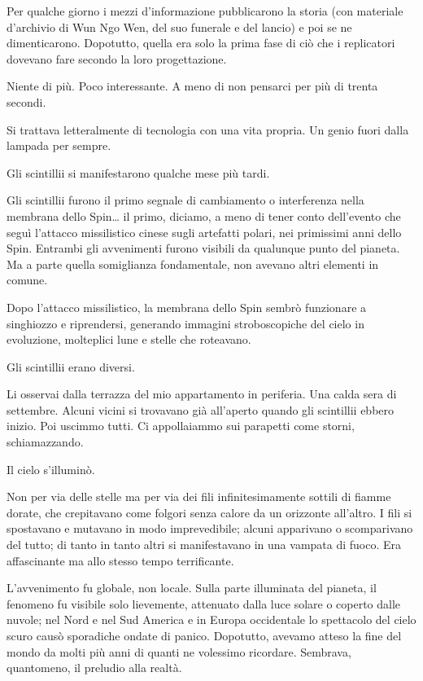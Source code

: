 Per qualche giorno i mezzi d'informazione pubblicarono la storia (con
materiale d'archivio di Wun Ngo Wen, del suo funerale e del lancio) e
poi se ne dimenticarono. Dopotutto, quella era solo la prima fase di ciò
che i replicatori dovevano fare secondo la loro progettazione.

Niente di più. Poco interessante. A meno di non pensarci per più di
trenta secondi.

Si trattava letteralmente di tecnologia con una vita propria. Un genio
fuori dalla lampada per sempre.

\separatorefiori

Gli scintillii si manifestarono qualche mese più tardi.

Gli scintillii furono il primo segnale di cambiamento o interferenza
nella membrana dello Spin\ldots{} il primo, diciamo, a meno di tener
conto dell'evento che seguì l'attacco missilistico cinese sugli
artefatti polari, nei primissimi anni dello Spin. Entrambi gli
avvenimenti furono visibili da qualunque punto del pianeta. Ma a parte
quella somiglianza fondamentale, non avevano altri elementi in comune.

Dopo l'attacco missilistico, la membrana dello Spin sembrò funzionare a
singhiozzo e riprendersi, generando immagini stroboscopiche del cielo in
evoluzione, molteplici lune e stelle che roteavano.

Gli scintillii erano diversi.

Li osservai dalla terrazza del mio appartamento in periferia. Una calda
sera di settembre. Alcuni vicini si trovavano già all'aperto quando gli
scintillii ebbero inizio. Poi uscimmo tutti. Ci appollaiammo sui
parapetti come storni, schiamazzando.

Il cielo s'illuminò.

Non per via delle stelle ma per via dei fili infinitesimamente sottili
di fiamme dorate, che crepitavano come folgori senza calore da un
orizzonte all'altro. I fili si spostavano e mutavano in modo
imprevedibile; alcuni apparivano o scomparivano del tutto; di tanto in
tanto altri si manifestavano in una vampata di fuoco. Era affascinante
ma allo stesso tempo terrificante.

L'avvenimento fu globale, non locale. Sulla parte illuminata del
pianeta, il fenomeno fu visibile solo lievemente, attenuato dalla luce
solare o coperto dalle nuvole; nel Nord e nel Sud America e in Europa
occidentale lo spettacolo del cielo scuro causò sporadiche ondate di
panico. Dopotutto, avevamo atteso la fine del mondo da molti più anni di
quanti ne volessimo ricordare. Sembrava, quantomeno, il preludio alla
realtà.

